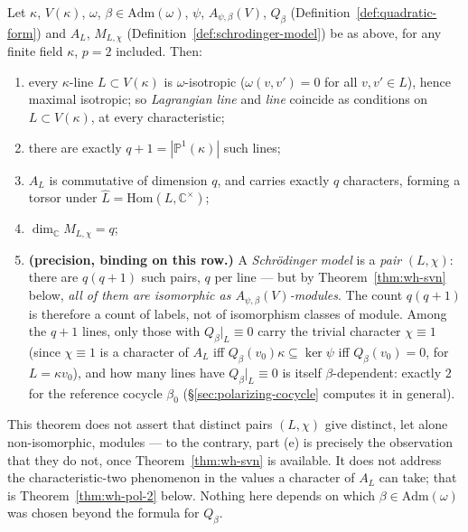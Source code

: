 
\statusProved
\begin{theorem}
\label{thm:wh-pol}
Let $\kappa$, $V(\kappa)$, $\omega$, $\beta\in\mathrm{Adm}(\omega)$, $\psi$,
$A_{\psi,\beta}(V)$, $Q_\beta$ (Definition~\ref{def:quadratic-form}) and
$A_L$, $M_{L,\chi}$ (Definition~\ref{def:schrodinger-model}) be as above, for
any finite field $\kappa$, $p=2$ included. Then:
\begin{enumerate}[label=(\alph*)]
\item every $\kappa$-line $L\subset V(\kappa)$ is $\omega$-isotropic
($\omega(v,v')=0$ for all $v,v'\in L$), hence maximal isotropic; so
\emph{Lagrangian line} and \emph{line} coincide as conditions on
$L\subset V(\kappa)$, at every characteristic;
\item there are exactly $q+1=|\mathbb{P}^1(\kappa)|$ such lines;
\item $A_L$ is commutative of dimension $q$, and carries exactly $q$
characters, forming a torsor under $\hat L=\mathrm{Hom}(L,\mathbb{C}^\times)$;
\item $\dim_{\mathbb{C}} M_{L,\chi} = q$;
\item \textbf{(precision, binding on this row.)} A \emph{Schr\"odinger
model} is a \emph{pair} $(L,\chi)$: there are $q(q+1)$ such pairs, $q$ per
line — but by Theorem~\ref{thm:wh-svn} below, \emph{all of them are
isomorphic as $A_{\psi,\beta}(V)$-modules}. The count $q(q+1)$ is therefore a
count of labels, not of isomorphism classes of module. Among the $q+1$
lines, only those with $Q_\beta|_L \equiv 0$ carry the trivial character
$\chi\equiv 1$ (since $\chi\equiv 1$ is a character of $A_L$ iff
$Q_\beta(v_0)\kappa\subseteq\ker\psi$ iff $Q_\beta(v_0)=0$, for $L=\kappa v_0$),
and how many lines have $Q_\beta|_L\equiv 0$ is itself $\beta$-dependent:
exactly $2$ for the reference cocycle $\beta_0$ (\S\ref{sec:polarizing-cocycle}
computes it in general).
\end{enumerate}
\end{theorem}

\begin{scope}
This theorem does not assert that distinct pairs $(L,\chi)$ give distinct, let
alone non-isomorphic, modules — to the contrary, part (e) is precisely the
observation that they do not, once Theorem~\ref{thm:wh-svn} is available. It
does not address the characteristic-two phenomenon in the values a character
of $A_L$ can take; that is Theorem~\ref{thm:wh-pol-2} below. Nothing here
depends on which $\beta\in\mathrm{Adm}(\omega)$ was chosen beyond the formula
for $Q_\beta$.
\end{scope}

